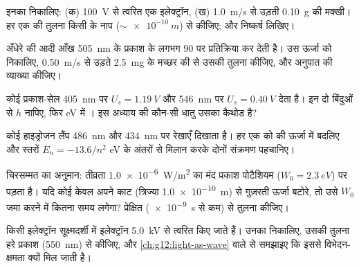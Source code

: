 \begin{exercise}[$\star\star$]\label{exo:g12:quantum-world:10}
इनका  निकालिए: (क) \qty{100}{V} से त्वरित एक
इलेक्ट्रॉन, (ख) \qty{1.0}{m/s} से उड़ती \qty{0.10}{g} की मक्खी। हर एक की तुलना किसी
 के नाप ($\sim \qty{e-10}{m}$) से कीजिए; और निष्कर्ष लिखिए।
\end{exercise}

\begin{exercise}[$\star\star$]\label{exo:g12:quantum-world:11}
अँधेरे की आदी आँख \qty{505}{nm} के प्रकाश के लगभग $90$  पर
प्रतिक्रिया कर देती है। उस ऊर्जा को निकालिए, \qty{0.50}{m/s} से उड़ते \qty{2.5}{mg}
के मच्छर की  से उसकी तुलना कीजिए, और अनुपात की व्याख्या
कीजिए।
\end{exercise}

\begin{exercise}[$\star\star\star$]\label{exo:g12:quantum-world:12}
कोई प्रकाश-सेल \qty{405}{nm} पर $U_s = \qty{1.19}{V}$ और \qty{546}{nm} पर $U_s =
\qty{0.40}{V}$ देता है। इन दो
बिंदुओं से $h$ नापिए, फिर \unit{eV} में । इस अध्याय की
कौन-सी धातु उसका कैथोड है?
\end{exercise}

\begin{exercise}[$\star\star\star$]\label{exo:g12:quantum-world:13}
कोई हाइड्रोजन लैंप \qty{486}{nm} और \qty{434}{nm} पर रेखाएँ दिखाता है। हर एक को
 की ऊर्जा में बदलिए और स्तरों $E_n = -13.6/n^2$ \unit{eV} के अंतरों
से मिलान करके दोनों संक्रमण पहचानिए।
\end{exercise}

\begin{exercise}[$\star\star\star$]\label{exo:g12:quantum-world:14}
चिरसम्मत  का अनुमान: तीव्रता \qty{1.0e-6}{W/m^2} का मंद प्रकाश पोटैशियम
($W_0 = \qty{2.3}{eV}$) पर पड़ता है। यदि कोई  केवल अपने  काट
(त्रिज्या \qty{1.0e-10}{m}) से गुज़रती ऊर्जा बटोरे, तो उसे $W_0$ जमा करने में
कितना समय लगेगा? प्रेक्षित  (\qty{e-9}{s} से कम) से तुलना कीजिए।
\end{exercise}

\begin{exercise}[$\star\star\star$]\label{exo:g12:quantum-world:15}
किसी इलेक्ट्रॉन सूक्ष्मदर्शी में इलेक्ट्रॉन \qty{5.0}{kV} से त्वरित किए जाते हैं।
उनका  निकालिए, उसकी तुलना हरे प्रकाश (\qty{550}{nm}) से
कीजिए, और \cref{ch:g12:light-as-wave} वाले  से समझाइए कि इससे विभेदन-क्षमता क्यों
मिल जाती है।
\end{exercise}

